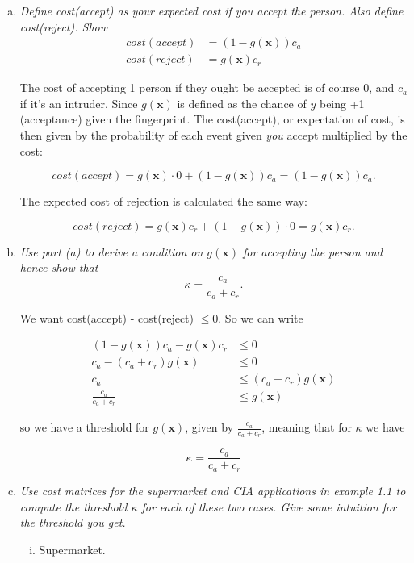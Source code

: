 \documentclass{article}
\renewcommand{\vec}[1]{\mathbf{#1}}
\begin{document}
\begin{enumerate}[(a)]
  \item \textit{Define cost(accept) as your expected cost if you accept the person. Also define
    cost(reject). Show 
    \begin{align*}
      cost(accept) &= (1-g(\vec{x}))c_a \\
      cost(reject) &= g(\vec{x})c_r
    \end{align*}}

    The cost of accepting 1 person if they ought be accepted is of course 0, and $c_a$ if it's
    an intruder. Since $g(\vec{x})$ is defined as the chance of $y$ being +1 (acceptance) given
    the fingerprint. The cost(accept), or expectation of cost, is then given by the probability
    of each event given \textit{you} accept multiplied by the cost:

    $$cost(accept) = g(\vec{x})\cdot0 + (1 - g(\vec{x}))c_a = (1-g(\vec{x}))c_a.$$

    The expected cost of rejection is calculated the same way:

    $$cost(reject) = g(\vec{x})c_r + (1-g(\vec{x}))\cdot0 = g(\vec{x})c_r.$$

  \item \textit{Use part (a) to derive a condition on $g(\vec{x})$ for accepting the person and
    hence show that $$\kappa = \frac{c_a}{c_a + c_r}.$$}

    We want cost(accept) - cost(reject) $\leq 0$. So we can write

    \begin{align*}
      (1-g(\vec{x}))c_a - g(\vec{x})c_r &\leq 0 \\
      c_a - (c_a + c_r)g(\vec{x}) &\leq 0 \\
      c_a &\leq (c_a + c_r)g(\vec{x}) \\
      \frac{c_a}{c_a + c_r} &\leq g(\vec{x})
    \end{align*}

    so we have a threshold for $g(\vec{x})$, given by $\frac{c_a}{c_a + c_r}$, meaning that for
    $\kappa$ we have 

    $$\kappa = \frac{c_a}{c_a+c_r}$$

  \item \textit{Use cost matrices for the supermarket and CIA applications in example 1.1 to
    compute the threshold $\kappa$ for each of these two cases. Give some intuition for the 
    threshold you get.}

    \begin{enumerate}[i.]
      \item Supermarket.
        

\end{enumerate}
\end{enumerate}
\end{document}
